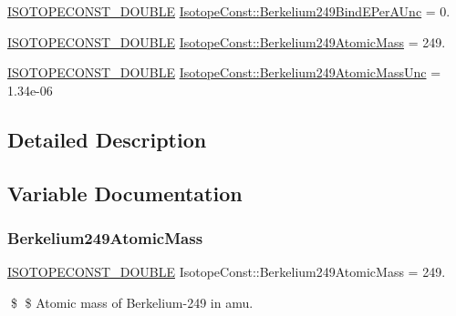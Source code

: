 \begin{DoxyCompactItemize}
\mbox{\hyperlink{group___isotope_const-_macros_ga8f45a7272ce02c0b4c65c44636ed719a}{I\+S\+O\+T\+O\+P\+E\+C\+O\+N\+S\+T\+\_\+\+D\+O\+U\+B\+LE}} \mbox{\hyperlink{group___isotope_const-_berkelium-_bk249_ga7a8a345ae506b848b462a49344027b0b}{Isotope\+Const\+::\+Berkelium249\+Bind\+E\+Per\+A\+Unc}} = 0.
\item 
\mbox{\hyperlink{group___isotope_const-_macros_ga8f45a7272ce02c0b4c65c44636ed719a}{I\+S\+O\+T\+O\+P\+E\+C\+O\+N\+S\+T\+\_\+\+D\+O\+U\+B\+LE}} \mbox{\hyperlink{group___isotope_const-_berkelium-_bk249_gac2e22aa9526e4c29f9009fbe6b3306e6}{Isotope\+Const\+::\+Berkelium249\+Atomic\+Mass}} = 249.
\item 
\mbox{\hyperlink{group___isotope_const-_macros_ga8f45a7272ce02c0b4c65c44636ed719a}{I\+S\+O\+T\+O\+P\+E\+C\+O\+N\+S\+T\+\_\+\+D\+O\+U\+B\+LE}} \mbox{\hyperlink{group___isotope_const-_berkelium-_bk249_ga3e1112ae463d799bd0b1606489ca4674}{Isotope\+Const\+::\+Berkelium249\+Atomic\+Mass\+Unc}} = 1.\+34e-\/06
\end{DoxyCompactItemize}


\subsection{Detailed Description}


\subsection{Variable Documentation}
\mbox{\label{group___isotope_const-_berkelium-_bk249_gac2e22aa9526e4c29f9009fbe6b3306e6}} 
\subsubsection{\texorpdfstring{Berkelium249\+Atomic\+Mass}{Berkelium249AtomicMass}}
{\footnotesize\ttfamily \mbox{\hyperlink{group___isotope_const-_macros_ga8f45a7272ce02c0b4c65c44636ed719a}{I\+S\+O\+T\+O\+P\+E\+C\+O\+N\+S\+T\+\_\+\+D\+O\+U\+B\+LE}} Isotope\+Const\+::\+Berkelium249\+Atomic\+Mass = 249.}

\$ \$ Atomic mass of Berkelium-\/249 in amu. \mbox{\label{group___isotope_const-_berkelium-_bk249_ga3e1112ae463d799bd0b1606489ca4674}} 
